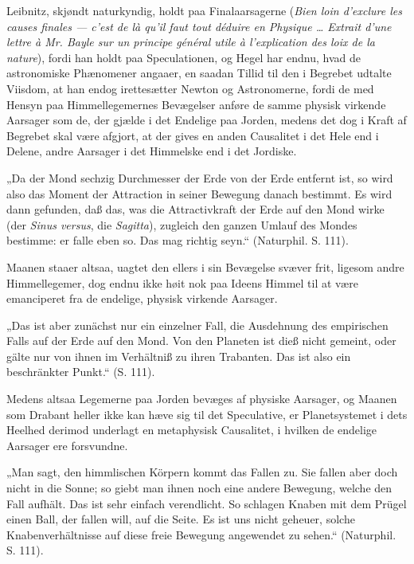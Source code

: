 \documentclass[12pt]{book}
\newcommand{\opage}[1]{\marginnote{\footnotesize\textit{[#1]}}}
\begin{document}
Leibnitz, skjøndt naturkyndig, holdt paa Finalaarsagerne (\textit{Bien loin
d'exclure les causes finales --- c'est de là qu'il faut tout déduire en Physique
\ldots{} Extrait d'une lettre à Mr. Bayle sur un principe général utile à
l'explication des loix de la nature}),
fordi han holdt paa Speculationen, og Hegel har endnu, hvad de astronomiske
Phænomener angaaer, en saadan Tillid til den i Begrebet udtalte Viisdom, at han
endog irettesætter Newton og Astronomerne,
fordi de med Hensyn paa Himmellegemernes Bevægelser anføre de samme physisk
virkende Aarsager som de, der gjælde i det Endelige paa Jorden, medens det dog i
Kraft
\opage{170} af Begrebet skal være afgjort, at der gives en anden Causalitet i det Hele end i
Delene, andre Aarsager i det Himmelske end i det Jordiske.

„Da der Mond sechzig Durchmesser der Erde von der Erde entfernt ist, so wird also
das Moment der Attraction in seiner Bewegung danach bestimmt. Es wird dann
gefunden, daß das, was die Attractivkraft der Erde auf den Mond wirke (der
\textit{Sinus versus}, die \textit{Sagitta}), zugleich den ganzen Umlauf des
Mondes bestimme: er falle eben so. Das mag richtig seyn.“ (Naturphil. S. 111).

Maanen staaer altsaa, uagtet den ellers i sin Bevægelse svæver frit, ligesom
andre Himmellegemer, dog endnu ikke høit nok paa Ideens Himmel til at være
emanciperet fra de endelige, physisk virkende Aarsager.

„Das ist aber zunächst nur ein einzelner Fall, die Ausdehnung des empirischen
Falls auf der Erde auf den Mond. Von den Planeten ist dieß nicht gemeint, oder
gälte nur von ihnen im Verhältniß zu ihren Trabanten. Das ist also ein
beschränkter Punkt.“ (S. 111).

Medens altsaa Legemerne paa Jorden bevæges af physiske Aarsager, og Maanen som
Drabant heller ikke kan hæve sig til det Speculative, er Planetsystemet i dets
Heelhed derimod underlagt en metaphysisk Causalitet, i hvilken de endelige
Aarsager ere forsvundne.

„Man sagt, den himmlischen Körpern kommt das Fallen zu. Sie fallen aber doch
nicht in die Sonne; so giebt man ihnen noch eine andere Bewegung, welche den Fall
aufhält. Das ist sehr einfach verendlicht. So schlagen Knaben mit dem Prügel
einen Ball, der fallen will, auf die Seite. Es ist uns nicht geheuer, solche
Knabenverhältnisse auf diese freie Bewegung angewendet zu sehen.“ (Naturphil. S.
111).
\end{document}
